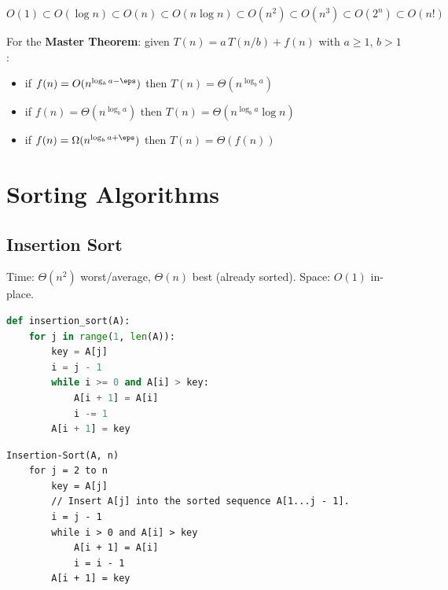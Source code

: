 \documentclass[11pt,a4paper,openany]{book}
\begin{document}
\begin{propbox}[title=Common growth rates (slowest to fastest)]
\[
  O(1) \subset O(\log n) \subset O(n) \subset O(n\log n) \subset O(n^2)
  \subset O(n^3) \subset O(2^n) \subset O(n!)
\]
\end{propbox}

\begin{rembox}
For the \textbf{Master Theorem}: given $T(n) = a\,T(n/b) + f(n)$ with $a \geq 1$, $b > 1$:
\begin{itemize}
  \item if $f(n) = O(n^{\log_b a - \eps})$ then $T(n) = \Theta(n^{\log_b a})$
  \item if $f(n) = \Theta(n^{\log_b a})$ then $T(n) = \Theta(n^{\log_b a} \log n)$
  \item if $f(n) = \Omega(n^{\log_b a + \eps})$ then $T(n) = \Theta(f(n))$
\end{itemize}
\end{rembox}










\chapter{Sorting Algorithms}

\section{Insertion Sort}

\begin{propbox}[title=Complexity]
Time: $\Theta(n^2)$ worst/average, $\Theta(n)$ best (already sorted). \quad Space: $O(1)$ in-place.
\end{propbox}

\begin{lstlisting}[language=Python]
def insertion_sort(A):
    for j in range(1, len(A)):
        key = A[j]
        i = j - 1
        while i >= 0 and A[i] > key:
            A[i + 1] = A[i]
            i -= 1
        A[i + 1] = key
\end{lstlisting}

\begin{lstlisting}
Insertion-Sort(A, n)
    for j = 2 to n
        key = A[j]
        // Insert A[j] into the sorted sequence A[1...j - 1].
        i = j - 1
        while i > 0 and A[i] > key
            A[i + 1] = A[i]
            i = i - 1
        A[i + 1] = key
\end{lstlisting}
\end{document}
